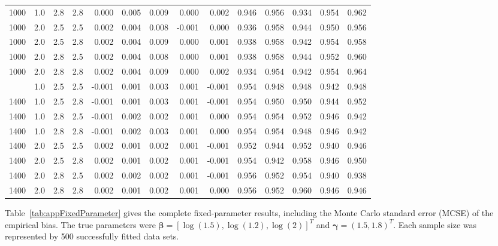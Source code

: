 \begin{table}[p]
{\begin{tabular}{ccccrrrrrrrrrr}
1000 & 1.0 & 2.8 & 2.8 &  0.000 & 0.005 &  0.009 &  0.000 & 0.002 & 0.946 & 0.956 & 0.934 & 0.954 & 0.962 \\
1000 & 2.0 & 2.5 & 2.5 &  0.002 & 0.004 &  0.008 & -0.001 & 0.000 & 0.936 & 0.958 & 0.944 & 0.950 & 0.956 \\
1000 & 2.0 & 2.5 & 2.8 &  0.002 & 0.004 &  0.009 &  0.000 & 0.001 & 0.938 & 0.958 & 0.942 & 0.954 & 0.958 \\
1000 & 2.0 & 2.8 & 2.5 &  0.002 & 0.004 &  0.008 &  0.000 & 0.001 & 0.938 & 0.958 & 0.944 & 0.952 & 0.960 \\
1000 & 2.0 & 2.8 & 2.8 &  0.002 & 0.004 &  0.009 &  0.000 & 0.002 & 0.934 & 0.954 & 0.942 & 0.954 & 0.964 \\
\addlinespace
1400 & 1.0 & 2.5 & 2.5 & -0.001 & 0.001 & 0.003 & 0.001 & -0.001 & 0.954 & 0.948 & 0.948 & 0.942 & 0.948 \\
1400 & 1.0 & 2.5 & 2.8 & -0.001 & 0.001 & 0.003 & 0.001 & -0.001 & 0.954 & 0.950 & 0.950 & 0.944 & 0.952 \\
1400 & 1.0 & 2.8 & 2.5 & -0.001 & 0.002 & 0.002 & 0.001 &  0.000 & 0.954 & 0.954 & 0.952 & 0.946 & 0.942 \\
1400 & 1.0 & 2.8 & 2.8 & -0.001 & 0.002 & 0.003 & 0.001 &  0.000 & 0.954 & 0.954 & 0.948 & 0.946 & 0.942 \\
1400 & 2.0 & 2.5 & 2.5 &  0.002 & 0.001 & 0.002 & 0.001 & -0.001 & 0.952 & 0.944 & 0.952 & 0.940 & 0.946 \\
1400 & 2.0 & 2.5 & 2.8 &  0.002 & 0.001 & 0.002 & 0.001 & -0.001 & 0.954 & 0.942 & 0.958 & 0.946 & 0.950 \\
1400 & 2.0 & 2.8 & 2.5 &  0.002 & 0.002 & 0.002 & 0.001 & -0.001 & 0.956 & 0.952 & 0.954 & 0.940 & 0.938 \\
1400 & 2.0 & 2.8 & 2.8 &  0.002 & 0.001 & 0.002 & 0.001 &  0.000 & 0.956 & 0.952 & 0.960 & 0.946 & 0.946 \\
\bottomrule
\end{tabular}}
\end{table}

\clearpage

Table~\ref{tab:appFixedParameter} gives the complete fixed-parameter results,
including the Monte Carlo standard error (MCSE) of the empirical bias. The
true parameters were
$\boldsymbol\beta=[\log(1.5),\log(1.2),\log(2)]^{T}$ and
$\boldsymbol\gamma=(1.5,1.8)^{T}$. Each sample size was represented by 500
successfully fitted data sets.

